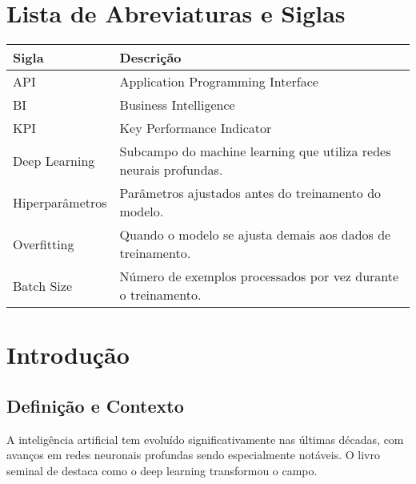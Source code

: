 


	
	
	
	
	
	
	
	
	
	
	
	
	
	
	
	\tableofcontents
	\newpage
	\listoffigures
	\newpage
	\listoftables
	\newpage
	
	\chapter*{Lista de Abreviaturas e Siglas}
	\begin{longtable}{p{3cm}p{10cm}}
		\textbf{Sigla} & \textbf{Descrição} \\
		\hline
		API & Application Programming Interface \\
		BI & Business Intelligence \\
		KPI & Key Performance Indicator \\
		Deep Learning & Subcampo do machine learning que utiliza redes neurais profundas. \\
		Hiperparâmetros & Parâmetros ajustados antes do treinamento do modelo. \\
		Overfitting & Quando o modelo se ajusta demais aos dados de treinamento. \\
		Batch Size & Número de exemplos processados por vez durante o treinamento. \\
	\end{longtable}
	
	\newpage
	
	\pagestyle{conteudo}
	
	\chapter{Introdução}
	\section{Definição e Contexto}
	A inteligência artificial tem evoluído significativamente nas últimas décadas, com avanços em redes neuronais profundas sendo especialmente notáveis. O livro seminal de \citet{goodfellow2016} destaca como o deep learning transformou o campo.
	
